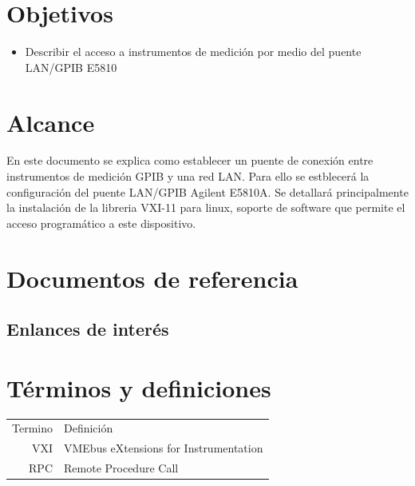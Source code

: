 \documentclass[paper=letter,oneside,fontsize=11pt, parskip=full]{scrartcl}
\newenvironment{link}
	{\ttfamily}{}
\begin{document}
	
	\clearpage
	
	\tableofcontents
	
	\section{Objetivos}
		\begin{itemize}
			\item Describir el acceso a instrumentos de medición por medio del puente LAN/GPIB E5810
		
		\end{itemize}
		
	\section{Alcance}
	
		En este documento se explica como establecer un puente de conexión entre instrumentos de medición GPIB y una red LAN. Para ello se estblecerá la configuración del puente LAN/GPIB Agilent E5810A. Se detallará principalmente la instalación de la libreria VXI-11 para linux, soporte de software que permite el acceso programático a este dispositivo.	
		
	\section{Documentos de referencia}
	
		\subsection{Enlances de interés}

	
			\begin{link}

			\end{link}	
	

	
	\section{Términos y definiciones}
	
		\begin{tabular}{rl}
			Termino 	& 	Definición \\	
			VXI			& 	VMEbus eXtensions for Instrumentation \\
			RPC			& 	Remote Procedure Call \\
		\end{tabular}
	
\end{document}
